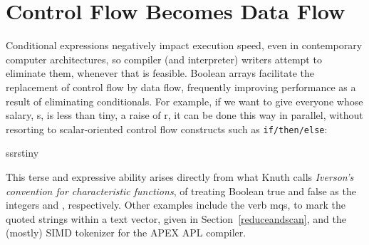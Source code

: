 \section{Control Flow Becomes Data Flow}
\label{controlflowtodataflow}

Conditional expressions negatively impact execution speed, even in
contemporary computer architectures, so compiler (and interpreter) 
writers attempt to eliminate them, whenever that is feasible.
Boolean arrays facilitate the replacement of control flow by
data flow, frequently improving performance as a result of 
eliminating conditionals.\cite{DBLP:conf/pldi/BerneckyS15}
For example, if we want to give everyone whose salary, 
{\apl s}, is less than {\apl tiny},
a raise of {\apl r}, it can be done this way in parallel, 
without resorting to scalar-oriented control flow constructs
such as {\tt if/then/else}: 

\medskip
{\apl s\qlarrow\0s\qplus\0r\qtimes\0s\qlt\0tiny}
\medskip

\noindent This terse and expressive ability arises directly from
what Knuth calls {\em Iverson's convention for characteristic functions}, 
of treating Boolean true and false as the integers {} and {}, 
respectively.
Other examples include the verb {\apl mqs}, to mark the 
quoted strings within a text vector, given in Section~\ref{reduceandscan},
and the (mostly) SIMD tokenizer for the 
APEX APL compiler.~\cite{RBernecky:apex,RBernecky:tokenizer}


